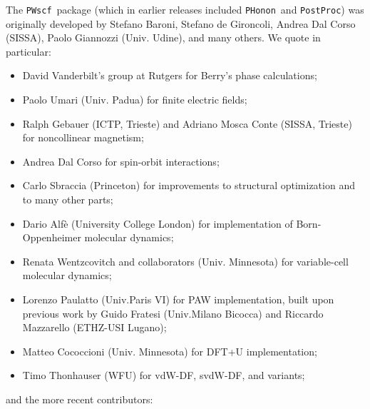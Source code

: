 \documentclass[12pt,a4paper]{article}
\def\PWscf{\texttt{PWscf}}
\def\PHonon{\texttt{PHonon}}
\def\PostProc{\texttt{PostProc}}
\begin{document}
The \PWscf\ package (which in earlier releases included
\PHonon\ and \PostProc)
was originally developed by Stefano Baroni, Stefano
de Gironcoli, Andrea Dal Corso (SISSA), Paolo Giannozzi (Univ. Udine), 
and many others. We quote in particular:
\begin{itemize}
  \item David Vanderbilt's group at Rutgers for Berry's phase
  calculations;
  \item Paolo Umari (Univ. Padua) for finite electric fields;
  \item Ralph Gebauer (ICTP, Trieste) and Adriano Mosca Conte
  (SISSA, Trieste) for noncollinear magnetism;
  \item Andrea Dal Corso for spin-orbit interactions;
  \item Carlo Sbraccia (Princeton) for improvements to structural
  optimization and to many other parts;
  \item Dario Alf\`e (University College London) for implementation
  of Born-Oppenheimer molecular dynamics;
  \item Renata Wentzcovitch and collaborators (Univ. Minnesota)
  for variable-cell molecular dynamics;
  \item Lorenzo Paulatto (Univ.Paris VI) for PAW implementation, 
  built upon previous work by Guido Fratesi (Univ.Milano Bicocca)
  and Riccardo Mazzarello (ETHZ-USI Lugano);
  \item Matteo Cococcioni (Univ. Minnesota) for DFT+U implementation;
  \item Timo Thonhauser (WFU) for vdW-DF, svdW-DF, and variants;
\end{itemize}
and the more recent contributors:
\end{document}
